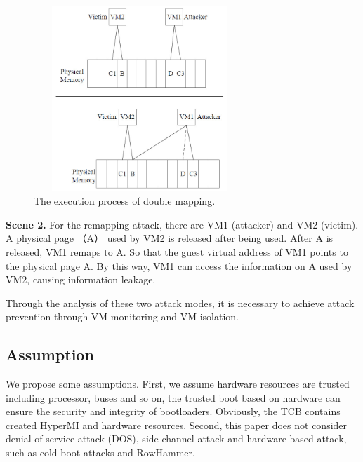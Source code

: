 \documentclass[conference]{IEEEtran}
\begin{document}
\begin{figure}
\centerline{\includegraphics[width=8cm, height=7cm]{VMCS0.jpg}}%
\caption{The execution process of double mapping. } \label{fig0}
\end{figure}

\textbf{Scene 2.}
    For the remapping attack, there are VM1 (attacker) and VM2 (victim). A physical page （A） used by VM2 is released after being used. After A is released, VM1 remaps to A. So that the guest virtual address of VM1 points to the physical page A. By this way, VM1 can access the information on A used by VM2, causing information leakage.

Through the analysis of these two attack modes, it is necessary to achieve attack prevention through VM monitoring and VM isolation.
\subsection{Assumption}

We propose some assumptions.
First, we assume hardware resources are trusted including processor, buses and so on, the trusted boot based on hardware can ensure the security and integrity of bootloaders. Obviously, the TCB contains created HyperMI and hardware resources. Second, this paper does not consider denial of service attack (DOS), side channel attack and hardware-based attack, such as cold-boot attacks and RowHammer.

\end{document}
